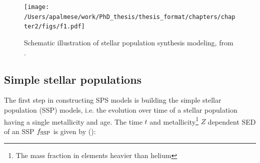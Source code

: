 \begin{figure}\centering
\texttt{[image: /Users/apalmese/work/PhD\_thesis/thesis\_format/chapters/chapter2/figs/f1.pdf]}\caption{Schematic illustration of stellar population synthesis modeling, from \citet{conroy}.}\label{fig:csp}
\end{figure}

\subsection{Simple stellar populations}
The first step in constructing SPS models is building the simple stellar population (SSP) models, i.e. the evolution over time of a stellar population having a single metallicity and age. The time $t$ and metallicity\footnote{The mass fraction in elements heavier than helium} $Z$ dependent SED of an SSP $f_{\rm SSP}$ is given by (\citealt{conroy}):

